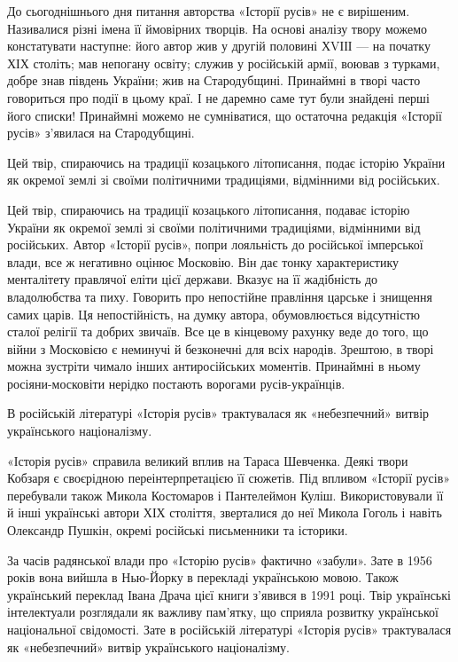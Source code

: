 До сьогоднішнього дня питання авторства «Історії русів» не є вирішеним.
Називалися різні імена її ймовірних творців. На основі аналізу твору можемо
констатувати наступне: його автор жив у другій половині ХVІІІ --- на початку ХІХ
століть; мав непогану освіту; служив у російській армії, воював з турками,
добре знав південь України; жив на Стародубщині. Принаймні в творі часто
говориться про події в цьому краї. І не даремно саме тут були знайдені перші
його списки! Принаймні можемо не сумніватися, що остаточна редакція «Історії
русів» з’явилася на Стародубщині.

Цей твір, спираючись на традиції козацького літописання, подає історію України
як окремої землі зі своїми політичними традиціями, відмінними від російських.

Цей твір, спираючись на традиції козацького літописання, подаває історію
України як окремої землі зі своїми політичними традиціями, відмінними від
російських. Автор «Історії русів», попри лояльність до російської імперської
влади, все ж негативно оцінює Московію. Він дає тонку характеристику
менталітету правлячої еліти цієї держави. Вказує на її жадібність до
владолюбства та пиху. Говорить про непостійне правління царське і знищення
самих царів. Ця непостійність, на думку автора, обумовлюється відсутністю
сталої релігії та добрих звичаїв. Все це в кінцевому рахунку веде до того, що
війни з Московією є неминучі й безконечні для всіх народів. Зрештою, в творі
можна зустріти чимало інших антиросійських моментів. Принаймні в ньому
росіяни-московіти нерідко постають ворогами русів-українців.

В російській літературі «Історія русів» трактувалася як «небезпечний» витвір
українського націоналізму.

«Історія русів» справила великий вплив на Тараса Шевченка. Деякі твори Кобзаря
є своєрідною переінтерпретацією її сюжетів. Під впливом «Історії русів»
перебували також Микола Костомаров і Пантелеймон Куліш. Використовували її й
інші українські автори ХІХ століття, зверталися до неї Микола Гоголь і навіть
Олександр Пушкін, окремі російські письменники та історики.

За часів радянської влади про «Історію русів» фактично «забули». Зате в 1956
років вона вийшла в Нью-Йорку в перекладі українською мовою. Також український
переклад Івана Драча цієї книги з’явився в 1991 році. Твір українські
інтелектуали розглядали як важливу пам’ятку, що сприяла розвитку української
національної свідомості. Зате в російській літературі «Історія русів»
трактувалася як «небезпечний» витвір українського націоналізму.

